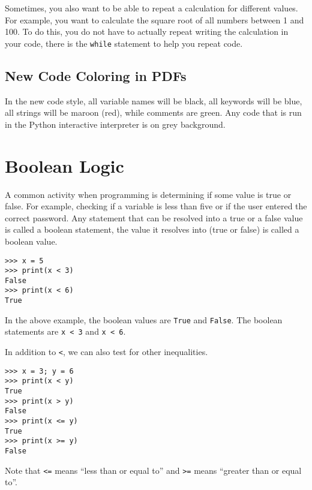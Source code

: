 \documentclass[11pt,hidelinks]{article}
\begin{document}
Sometimes, you also want to be able to repeat a calculation for different
values. For example, you want to calculate the square root of all numbers
between 1 and 100. To do this, you do not have to actually repeat writing the
calculation in your code, there is the \lstinline!while! statement to help you
repeat code.

\subsection{New Code Coloring in PDFs}
In the new code style, all variable names will be black, all keywords will be
blue, all strings will be maroon (red), while comments are green. Any code that
is run in the Python interactive interpreter is on grey background.


\pagebreak
\section{Boolean Logic}
A common activity when programming is determining if some value is true or
false. For example, checking if a variable is less than five or if the user
entered the correct password. Any statement that can be resolved into a true or
a false value is called a boolean statement, the value it resolves into (true or
false) is called a boolean value.

\begin{lstlisting}[style=ipython]
>>> x = 5
>>> print(x < 3)
False
>>> print(x < 6)
True
\end{lstlisting}

In the above example, the boolean values are \lstinline{True} and
\lstinline{False}. The boolean statements are \lstinline{x < 3} and 
\lstinline{x < 6}. 

In addition to \lstinline{<}, we can also test for other
inequalities.
\begin{lstlisting}[style=ipython]
>>> x = 3; y = 6
>>> print(x < y)
True
>>> print(x > y)
False
>>> print(x <= y)
True
>>> print(x >= y)
False
\end{lstlisting}

Note that \lstinline{<=} means ``less than or equal to'' and \lstinline{>=}
means ``greater than or equal to''. 
\end{document}
